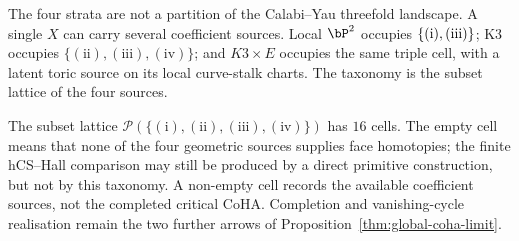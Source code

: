 \begin{remark}
\label{rem:strata-not-partition}
The four strata are not a partition of the Calabi--Yau
threefold landscape. A single $X$ can carry several coefficient
sources. Local $\bP^2$ occupies $\{(\text i),(\text{iii})\}$; K3
occupies $\{(\text{ii}),(\text{iii}),(\text{iv})\}$; and
$K3\times E$ occupies the same triple cell, with a latent toric source
on its local curve-stalk charts. The taxonomy is the subset lattice of
the four sources.
\end{remark}

\begin{remark}
\label{rem:fifteen-cells}
The subset lattice
$\mathcal P(\{(\text{i}),(\text{ii}),(\text{iii}),(\text{iv})\})$ has
$16$ cells. The empty cell means that none of the four geometric
sources supplies face homotopies; the finite hCS--Hall comparison may
still be produced by a direct primitive construction, but not by this
taxonomy. A non-empty cell records the available coefficient sources,
not the completed critical CoHA. Completion and vanishing-cycle
realisation remain the two further arrows of
Proposition~\ref{thm:global-coha-limit}.
\end{remark}


